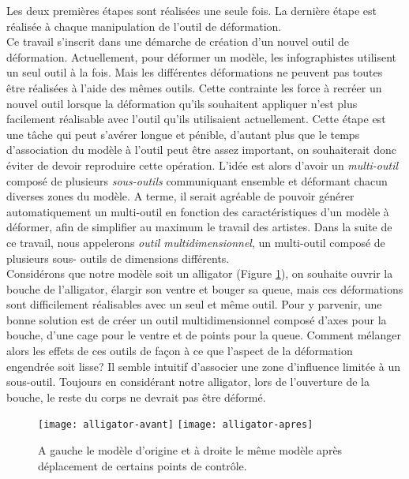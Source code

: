 Les deux premières étapes sont réalisées une seule fois. La dernière étape est
réalisée à chaque manipulation de l'outil de déformation. \\

Ce travail s'inscrit dans une démarche de création d'un nouvel outil de
déformation. Actuellement, pour déformer un modèle, les infographistes
utilisent un seul outil à la fois. Mais les différentes déformations ne
peuvent pas toutes être réalisées à l'aide des mêmes outils. Cette contrainte
les force à recréer un nouvel outil lorsque la déformation qu'ils souhaitent
appliquer n'est plus facilement réalisable avec l'outil qu'ils utilisaient
actuellement. Cette étape est une tâche qui peut s'avérer longue et pénible,
d'autant plus que le temps d'association du modèle à l'outil peut être assez
important, on souhaiterait donc éviter de devoir reproduire cette opération.
L'idée est alors d'avoir un \textit {multi-outil} composé de plusieurs \textit
{sous-outils} communiquant ensemble et déformant chacun diverses zones du
modèle. A terme, il serait agréable de pouvoir générer automatiquement un
multi-outil en fonction des caractéristiques d'un modèle à déformer, afin de
simplifier au maximum le travail des artistes. Dans la suite de ce travail,
nous appelerons \textit{outil multidimensionnel}, un multi-outil composé de
plusieurs sous- outils de dimensions différents. \\

Considérons que notre modèle soit un alligator (Figure \ref{INTall}), on
souhaite ouvrir la bouche de l'alligator, élargir son ventre et bouger sa
queue, mais ces déformations sont difficilement réalisables avec un seul et
même outil. Pour y parvenir, une bonne solution est de créer un outil
multidimensionnel composé d'axes pour la bouche, d'une cage pour le ventre et
de points pour la queue. Comment mélanger alors les effets de ces outils de
façon à ce que l'aspect de la déformation engendrée soit lisse? Il semble
intuitif d'associer une zone d'influence limitée à un sous-outil. Toujours en
considérant notre alligator, lors de l'ouverture de la bouche, le reste du
corps ne devrait pas être déformé. \\

\begin{figure}[ht]
  \texttt{[image: alligator-avant]}
  \texttt{[image: alligator-apres]}

  \caption[Explication déformation multi-outil]   {A gauche le modèle d'origine
et à droite le même modèle après déplacement de certains points de contrôle.}

  \label{INTall}
\end{figure}

